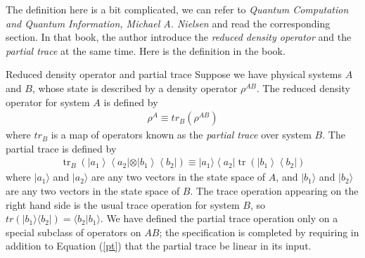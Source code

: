 \documentclass[UTF8,12pt]{article} %
\begin{document}
The definition here is a bit complicated, we can refer to \textit{Quantum Computation and Quantum Information, Michael A. Nielsen} and read the corresponding section. In that book, the author introduce the \textit{reduced density operator} and the \textit{partial trace} at the same time. Here is the definition in the book.\\

\begin{definition}{Reduced density operator and partial trace}{}
Suppose we have physical systems $A$ and $B$, whose state is described by a density operator $\rho^{AB}$. The reduced density operator for system $A$ is defined by
\begin{align}
\rho^{A} \equiv tr_{B}(\rho^{AB})
\end{align}
where $tr_{B}$ is a map of operators known as the \textit{partial trace} over system $B$. The partial trace is defined by
\begin{align}\label{pt}
\operatorname{tr}_{B}\left( | a_{1}\right\rangle\left\langle a_{2}|\otimes| b_{1}\right\rangle\left\langle b_{2} |\right) \equiv | a_{1} \rangle\left\langle a_{2} | \operatorname{tr}\left( | b_{1}\right\rangle\left\langle b_{2} |\right)\right.
\end{align}
where $|a_{1}\rangle$ and $|a_{2}\rangle$ are any two vectors in the state space of $A$, and $|b_{1}\rangle$ and $|b_{2}\rangle$ are any two vectors in the state space of $B$. The trace operation appearing on the right hand side is the usual trace operation for system $B$, so $tr(|b_{1}\rangle\langle b_{2}|) = \langle b_{2}|b_{1}\rangle$. We have defined the partial trace operation only on a special subclass of operators on $AB$; the specification is completed by requiring in addition to Equation (\ref{pt}) that the partial trace be linear in its input.
\end{definition}
\end{document}
